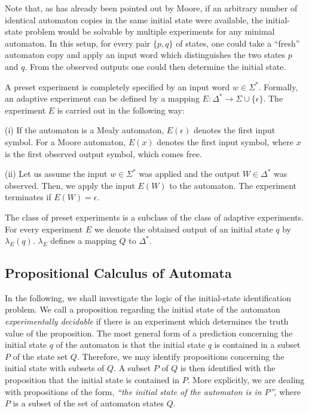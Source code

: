 Note that, as has already been pointed out by Moore,
if an arbitrary number of identical automaton copies
in the same initial state were available,
the initial-state problem would be solvable by multiple
experiments
for any minimal automaton.
In this setup,
for every pair $\{p,q\}$  of states, one could take a ``fresh''
automaton copy and apply an input word which distinguishes the two
states $p$ and $q$. From the observed outputs one could then determine
the initial state.

A preset experiment is completely specified by an input word $w \in \Sigma^*$.
Formally, an adaptive experiment can be defined by a mapping
$E: \Delta^* \rightarrow \Sigma \cup \{\epsilon\}$.
The experiment $E$ is carried out in the following way:

(i) If the automaton is a Mealy automaton, $E(\epsilon)$ denotes the
first input symbol.
For a Moore automaton, $E(x)$ denotes the first input symbol, where $x$ is the
first observed output symbol, which comes free.

(ii) Let us assume the input $w \in \Sigma^*$ was applied and the
output $W \in \Delta^*$ was observed.
Then, we apply the input $E(W)$ to the automaton.
The experiment terminates if $E(W) = \epsilon$.

The class of preset experiments is a subclass of the class
of adaptive experiments.
For every experiment $E$ we denote the obtained output of an initial
state $q$ by $\lambda_E(q)$.
$\lambda_E$ defines a mapping $Q$ to $\Delta^*$.

\subsection{Propositional Calculus of Automata}

In the following, we shall investigate the logic of the initial-state
identification problem.
We call a proposition regarding the initial state of the automaton
{\em experimentally decidable} if there is an experiment which
determines the truth value of the proposition.
The most general form of a prediction concerning the initial state $q$
of the automaton is that the initial state $q$ is contained in a subset $P$ of the
state set $Q$.
Therefore, we may identify propositions concerning the initial state
with subsets of $Q$.
A subset $P$ of $Q$ is then  identified with the proposition that the
initial state is contained in $P$.
More explicitly, we are dealing with propositions of the form,
{\em ``the initial  state of the automaton is in $P$''},
where $P$ is a subset of the set of automaton states $Q$.

